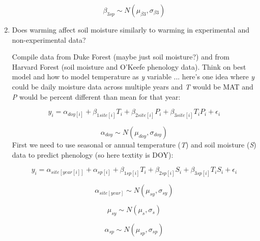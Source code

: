 \documentclass{article}
\begin{document}
\begin{enumerate}
\begin{equation}
\beta_{3 sp} \sim N(\mu_{\beta3}, \sigma_{\beta3})
\end{equation}

\item{Does warming affect soil moisture similarly to warming in experimental and non-experimental data?}

\par Compile data from Duke Forest (maybe just soil moisture?) and from Harvard Forest (soil moisture and O'Keefe phenology data). Think on best model and how to model temperature as \textit{y} variable ... here's one idea where \textit{y} could be daily moisture data across multiple years and \textit{T} would be MAT and \textit{P} would be percent different than mean for that year:



\begin{equation}
y_{i}=\alpha_{doy[i]}+\beta_{1 site[i]}T_i+\beta_{2 site[i]}P_i+\beta_{3 site[i]}T_iP_i+\epsilon_{i}
\end{equation}

\begin{equation}
\alpha_{doy} \sim N(\mu_{doy}, \sigma_{doy})
\end{equation}
\noindent First we need to use seasonal or annual temperature (\textit{T}) and soil moisture (\textit{S}) data to predict phenology (so here textit{y} is DOY):

\begin{equation}
y_{i}=\alpha_{site[year[i]]}+ \alpha_{sp[i]}+\beta_{1 sp[i]}T_i+\beta_{2 sp[i]}S_i+\beta_{3 sp[i]}T_iS_i+\epsilon_{i}
\end{equation}

\begin{equation}
\alpha_{site[year]} \sim N(\mu_{sy}, \sigma_{sy})
\end{equation}

\begin{equation}
\mu_{sy} \sim N(\mu_{s}, \sigma_{s})
\end{equation}

\begin{equation}
\alpha_{sp} \sim N(\mu_{sp}, \sigma_{sp})
\end{equation}



\end{enumerate}
\end{document}
